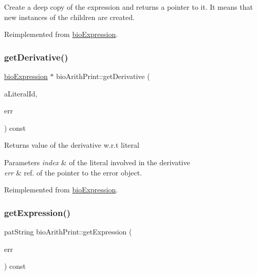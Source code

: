 Create a deep copy of the expression and returns a pointer to it. It means that new instances of the children are created. 

Reimplemented from \hyperlink{classbio_expression_a4ee1b8add634078a02eaae26cd40dcc8}{bio\+Expression}.

\mbox{\label{classbio_arith_print_aa9f08ee87d538bb2c90497e4b50948e1}} 
\subsubsection{\texorpdfstring{get\+Derivative()}{getDerivative()}}
{\footnotesize\ttfamily \hyperlink{classbio_expression}{bio\+Expression} $\ast$ bio\+Arith\+Print\+::get\+Derivative (\begin{DoxyParamCaption}\item[{pat\+U\+Long}]{a\+Literal\+Id,  }\item[{pat\+Error $\ast$\&}]{err }\end{DoxyParamCaption}) const\hspace{0.3cm}{\ttfamily [virtual]}}

\begin{DoxyReturn}{Returns}
value of the derivative w.\+r.\+t literal 
\end{DoxyReturn}

\begin{DoxyParams}{Parameters}
{\em index} & of the literal involved in the derivative \\
\hline
{\em err} & ref. of the pointer to the error object. \\
\hline
\end{DoxyParams}


Reimplemented from \hyperlink{classbio_expression_a5915579d1193f25f216c1e273c97f2ce}{bio\+Expression}.

\mbox{\label{classbio_arith_print_a7799066d3d3f68a685c89f46025f5aa8}} 
\subsubsection{\texorpdfstring{get\+Expression()}{getExpression()}}
{\footnotesize\ttfamily pat\+String bio\+Arith\+Print\+::get\+Expression (\begin{DoxyParamCaption}\item[{pat\+Error $\ast$\&}]{err }\end{DoxyParamCaption}) const\hspace{0.3cm}{\ttfamily [virtual]}}

